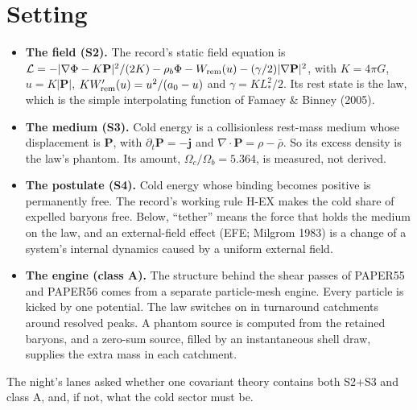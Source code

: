 \documentclass[10pt]{article}
\begin{document}
\section{Setting}
\begin{itemize}
\item \textbf{The field (S2).} The record's static field equation is $\mathcal L=-|\nabla\Phi-K\mathbf P|^2/(2K)-\rho_b\Phi-W_{\rm rem}(u)-(\gamma/2)|\nabla\mathbf P|^2$, with $K=4\pi G$, $u=K|\mathbf P|$, $KW_{\rm rem}'(u)=u^2/(a_0-u)$ and $\gamma=KL_*^2/2$. Its rest state is the law, which is the simple interpolating function of Famaey \& Binney (2005).
\item \textbf{The medium (S3).} Cold energy is a collisionless rest-mass medium whose displacement is $\mathbf P$, with $\partial_t\mathbf P=-\mathbf j$ and $\nabla\cdot\mathbf P=\rho-\bar\rho$. So its excess density is the law's phantom. Its amount, $\Omega_c/\Omega_b=5.364$, is measured, not derived.
\item \textbf{The postulate (S4).} Cold energy whose binding becomes positive is permanently free. The record's working rule H-EX makes the cold share of expelled baryons free. Below, ``tether'' means the force that holds the medium on the law, and an external-field effect (EFE; Milgrom 1983) is a change of a system's internal dynamics caused by a uniform external field.
\item \textbf{The engine (class A).} The structure behind the shear passes of PAPER55 and PAPER56 comes from a separate particle-mesh engine. Every particle is kicked by one potential. The law switches on in turnaround catchments around resolved peaks. A phantom source is computed from the retained baryons, and a zero-sum source, filled by an instantaneous shell draw, supplies the extra mass in each catchment.
\end{itemize}
The night's lanes asked whether one covariant theory contains both S2+S3 and class A, and, if not, what the cold sector must be.
\end{document}
